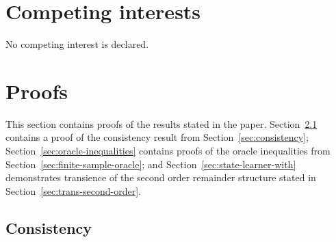 \documentclass[11pt]{article}
\theoremstyle{thmstyleone}%
\theoremstyle{thmstyletwo}%
\theoremstyle{thmstylethree}%
\newcommand*\diff{\mathop{}\!\mathrm{d}}
\newcommand{\1}{\mathds{1}}
\begin{document}
\section{Competing interests}
No competing interest is declared.



\appendix

\section{Proofs}
\label{sec:proofs}

This section contains proofs of the results stated in the paper.
Section~\ref{sec:consistency-proof} contains a proof of the consistency result
from Section~\ref{sec:consistency}; Section~\ref{sec:oracle-inequalities}
contains proofs of the oracle inequalities from
Section~\ref{sec:finite-sample-oracle}; and
Section~\ref{sec:state-learner-with} demonstrates transience of the second
order remainder structure stated in Section~\ref{sec:trans-second-order}.


\subsection{Consistency}
\label{sec:consistency-proof}
\end{document}
